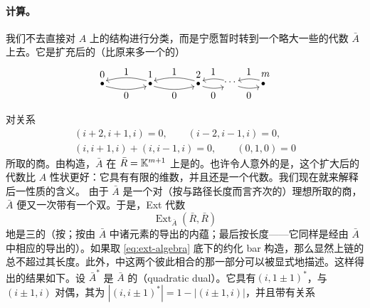 \paragraph{\trHochschildCohomology{}计算。}\label{sub:hochschild-computation}
我们不去直接对 $A$ 上的\trAinfty{}结构进行分类，而是宁愿暂时转到一个略大一些的代数 $\bar{A}$ 上去。它是扩充后的（比原来多一个\trVertex{}的）\trQuiver
\begin{equation}\label{eq:extended-quiver}
\begin{tikzpicture}[line cap=round,line join=round]
\fill (0,0) circle (1.7pt);
\node at (0,0.32) {$0$};
\fill (1.7,0) circle (1.7pt);
\node at (1.7,0.32) {$1$};
\fill (3.4,0) circle (1.7pt);
\node at (3.4,0.32) {$2$};
\node at (4.55,0.05) {$\cdots$};
\fill (5.7,0) circle (1.7pt);
\node at (5.78,0.32) {$m$};
\draw[->] (1.56,0.1) to[bend right=15] (0.14,0.1);
\node at (0.85,0.42) {$1$};
\draw[->] (0.14,-0.1) to[bend right=15] (1.56,-0.1);
\node at (0.85,-0.42) {$0$};
\draw[->] (3.26,0.1) to[bend right=15] (1.84,0.1);
\node at (2.55,0.42) {$1$};
\draw[->] (1.84,-0.1) to[bend right=15] (3.26,-0.1);
\node at (2.55,-0.42) {$0$};
\draw[->] (4.3,0.12) to[bend right=15] (3.56,0.1);
\node at (3.93,0.42) {$1$};
\draw[->] (3.56,-0.1) to[bend right=15] (4.3,-0.12);
\node at (3.93,-0.42) {$0$};
\draw[->] (5.56,0.12) to[bend right=15] (4.82,0.1);
\node at (5.19,0.42) {$1$};
\draw[->] (4.82,-0.1) to[bend right=15] (5.56,-0.12);
\node at (5.19,-0.42) {$0$};
\end{tikzpicture}
\end{equation}
对关系
\begin{equation*}
\begin{gathered}
(i+2,i+1,i)=0,\qquad (i-2,i-1,i)=0,\\
(i,i+1,i)+(i,i-1,i)=0,\qquad (0,1,0)=0
\end{gathered}
\end{equation*}
所取的商。由构造，$\bar{A}$ 在 $\bar{R}=\mathbb{K}^{m+1}$ 上是\trLinear{}的。也许令人意外的是，这个扩大后的代数比 $A$ 性状更好：它具有有限的\trCohomology{}维数，并且还是一个\trKoszul{}代数。我们现在就来解释后一性质的含义。
由于 $\bar{A}$ 是一个\trPathAlgebra{}对（按\trDegree{}与路径长度而言齐次的）理想所取的商，$\bar{A}$ 便又一次带有一个双\trGrading。于是，Ext 代数
\begin{equation}\label{eq:ext-algebra}
\operatorname{Ext}_{\bar{A}}(\bar{R},\bar{R})
\end{equation}
\trApriori{}地是三\trGraded{}的（按\trCohomology\trDegree；按由 $\bar{A}$ 中诸元素的\trDegree{}导出的内蕴\trGrading；最后按长度\trGrading——它同样是经由 $\bar{A}$ 中相应的\trGrading{}导出的）。如果取 \eqref{eq:ext-algebra} 底下的约化 bar 构造，那么显然上链的\trCohomology\trGrading{}总不超过其长度\trGrading。此外，\trCochainComplex{}中这两个\trGrading{}彼此相合的那一部分可以被显式地描述。这样得出的结果如下。设 $\bar{A}^*$ 是 $\bar{A}$ 的\textbf{\trQuadraticDual{}}（quadratic dual）。它具有\trGenerator{}$(i,1\pm 1)^*$，与 $(i\pm 1,i)$ 对偶，其\trDegree{}为 $|(i,i\pm 1)^*|=1-|(i\pm 1,i)|$，并且带有关系

